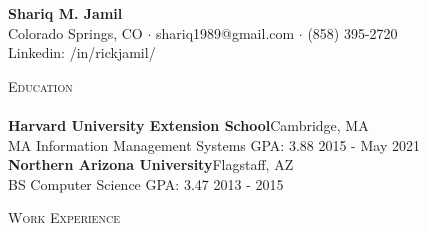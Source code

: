 \documentclass[a4paper]{article}
\newcommand{\lineunder} {
    \vspace*{-8pt} \\
    \hspace*{-18pt} \hrulefill \\
}
\newcommand{\header} [1] {
    {\hspace*{-18pt}\vspace*{6pt} \textsc{#1}}
    \vspace*{-6pt} \lineunder
}
\begin{document}
\vspace*{-40pt}

    

\vspace*{-10pt}
\begin{center}
	{\Huge \bfseries {Shariq M. Jamil}}\\
	Colorado Springs, CO $\cdot$ shariq1989@gmail.com $\cdot$ (858) 395-2720\\
	Linkedin: /in/rickjamil/
\end{center}

\header{Education}
\textbf{Harvard University Extension School}\hfill Cambridge, MA\\
MA Information Management Systems \textrm{GPA: 3.88} \hfill 2015 - May 2021\\
\vspace{2mm}
\textbf{Northern Arizona University}\hfill Flagstaff, AZ\\
BS Computer Science \textrm{GPA: 3.47} \hfill 2013 - 2015\\
\vspace{2mm}

\header{Work Experience}
\vspace{1mm}
\end{document}
